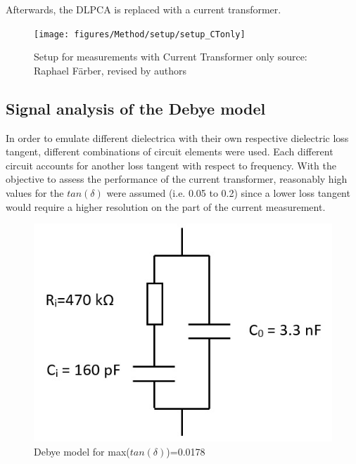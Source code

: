 Afterwards, the DLPCA is replaced with a current transformer. 
\begin{figure}[htbp]
	\centering
	\texttt{[image: figures/Method/setup/setup\_CTonly]}		
	\caption[Kurze Abbildungsbeschreibung]{Setup for measurements with Current Transformer only {source: Raphael F\"arber, revised by authors}} 
	\label{sec.setup }

\end{figure}


\subsection{Signal analysis of the Debye model}

In order to emulate different dielectrica with their own respective dielectric loss tangent, different combinations of circuit elements were used. Each different circuit accounts for another loss tangent with respect to frequency. With the objective to assess the performance of the current transformer, reasonably high values for the $tan\left(\delta\right)$ were assumed (i.e. 0.05 to 0.2) since a lower loss tangent would require a higher resolution on the part of the current measurement.
\begin{figure}
	\includegraphics[width=\textwidth]{figures/Method/debye-modell.jpg}	
	\caption{Debye model for max($tan(\delta)$)=0.0178}	
	\label{fig.debye-modell}
\end{figure}

